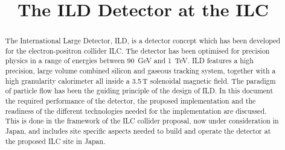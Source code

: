\documentclass[%
 amsmath,amssymb,
 aps,
 longbibliography,
]{revtex4-1}
\begin{document}


\title{The ILD Detector at the ILC}%






\begin{abstract}
The International Large Detector, ILD, is a detector concept which has been developed for the electron-positron collider ILC. The detector has been optimised for precision physics in a range of energies between 90~GeV and 1~TeV. ILD features a high precision, large volume combined silicon and gaseous tracking system, together with a high granularity calorimeter all inside a 3.5\,T solenoidal magnetic field. The paradigm of particle flow has been the  guiding principle of the design of ILD. In this document the required performance of the detector, the proposed implementation and the readiness of the different technologies needed for the implementation are discussed. This is done in the framework of the ILC collider proposal, now under consideration in Japan, and includes site specific aspects needed to build and operate the detector at the proposed ILC site in Japan.


\end{abstract}

\end{document}
